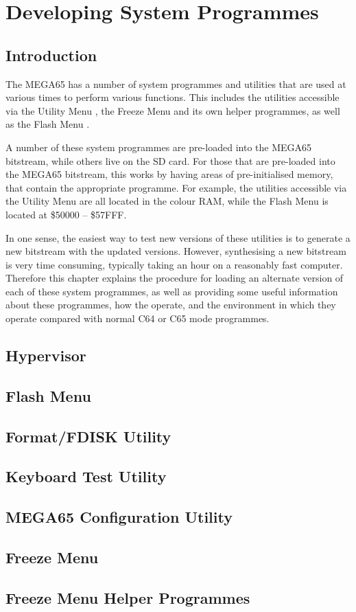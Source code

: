 \chapter{Developing System Programmes}

\section{Introduction}

The MEGA65 has a number of system programmes and utilities that are used at various times to perform various functions.
This includes the utilities accessible via the Utility Menu , the Freeze Menu  and
its own helper programmes, as well as the Flash Menu .

A number of these system programmes are pre-loaded into the MEGA65 bitstream, while others live on the SD card.
For those that are pre-loaded into the MEGA65 bitstream, this works by having areas of pre-initialised memory, that
contain the appropriate programme.  For example, the utilities accessible via the Utility Menu are all located in
the colour RAM, while the Flash Menu is located at \$50000 -- \$57FFF.

In one sense, the easiest way to test new versions of these utilities is to generate a new bitstream with the updated versions.
However, synthesising a new bitstream is very time consuming, typically taking an hour on a reasonably fast computer.
Therefore this chapter explains the procedure for loading an alternate version of each of these system programmes, as well as
providing some useful information about these programmes, how the operate, and the environment in which they operate compared
with normal C64 or C65 mode programmes.

\section{Hypervisor}

\section{Flash Menu}

\section{Format/FDISK Utility}

\section{Keyboard Test Utility}

\section{MEGA65 Configuration Utility}

\section{Freeze Menu}

\section{Freeze Menu Helper Programmes}
